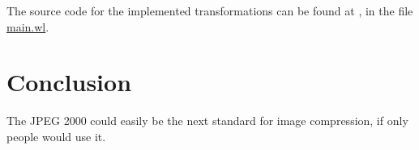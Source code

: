 \documentclass[12pt]{article}
\begin{document}
The source code for the implemented transformations can be found at \cite{repo},
in the file \href{https://raw.githubusercontent.com/TexAgg/Math-414-Final-Project/master/main.wl}{main.wl}.


\section{Conclusion}

The JPEG 2000 could easily be the next standard for image compression, if only people would use it.


\printbibliography[]
\end{document}
